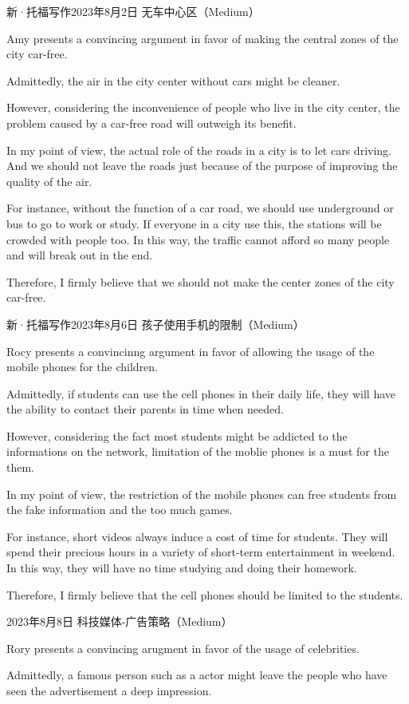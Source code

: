 新·托福写作2023年8月2日 无车中心区（Medium）

Amy presents a convincing argument in favor of making the central zones of the city car-free.

Admittedly, the air in the city center without cars might be cleaner.

However, considering the inconvenience of people who live in the city center, the problem caused by a car-free road will outweigh its benefit.

In my point of view, the actual role of the roads in a city is to let cars driving. And we should not leave the roads just because of the purpose of improving the quality of the air.

For instance, without the function of a car road, we should use underground or bus to go to work or study. If everyone in a city use this, the stations will be crowded with people too. In this way, the traffic cannot afford so many people and will break out in the end.

Therefore, I firmly believe that we should not make the center zones of the city car-free.

新·托福写作2023年8月6日 孩子使用手机的限制（Medium）

Rocy presents a convincinng argument in favor of allowing the usage of the mobile phones for the children.

Admittedly, if students can use the cell phones in their daily life, they will have the ability to contact their parents in time when needed.

However, considering the fact most students might be addicted to the informations on the network, limitation of the moblie phones is a must for the them.

In my point of view, the restriction of the mobile phones can free students from the fake information and the too much games.

For instance, short videos always induce a cost of time for students. They will spend their precious hours in a variety of short-term entertainment in weekend. In this way, they will have no time studying and doing their homework.

Therefore, I firmly believe that the cell phones should be limited to the students.

2023年8月8日 科技媒体-广告策略（Medium）

Rory presents a convincing arugment in favor of the usage of celebrities.

Admittedly, a famous person such as a actor might leave the people who have seen the advertisement a deep impression.

